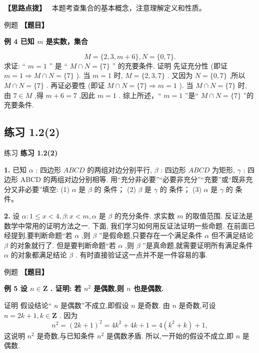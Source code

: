 \documentclass[a4paper,10pt,oneside,fontset=none]{ctexbook}
\renewcommand{\leq}{\leqslant}
\newcommand{\fillin}[1][2cm]{\,\underline{\hspace{#1}}\,}
\newcounter{example}[chapter]
\newenvironment{example}[1][]{\begin{exBox}{例题}{#1}}{\end{exBox}}
\newenvironment{exercise}[1][]{\begin{exBox}{练习}{#1}}{\end{exBox}}
\numberwithin{equation}{chapter}
\newenvironment{hint}{\begin{hintBox}\textbf{【思路点拨】}~}{\end{hintBox}}
\begin{document}
\begin{hint}
本题考查集合的基本概念，注意理解定义和性质。
\end{hint}

\begin{example}
\textbf{【题目】}\par\vspace{0.3em}
\textbf{例 4 已知 $m$ 是实数，集合}\par\vspace{0.3em}
$$
M = \{ 2,3, m + 6\} , N = \{ 0,7\} .
$$
求证: “ $m = 1$ ” 是 “ $M \cap  N = \{ 7\}$ ” 的充要条件.
证明 先证充分性 (即证 $m = 1 \Rightarrow  M \cap  N = \{ 7\}$ ). 当 $m = 1$ 时, $M = \{ 2,3,7\}$ . 又因为 $N = \{ 0,7\}$ ,所以 $M \cap  N = \{ 7\}$ .
再证必要性 (即证 $M \cap  N = \{ 7\}  \Rightarrow  m = 1$ ). 当 $M \cap  N = \{ 7\}$ 时, 由 $7 \in  M$ ,得 $m + 6 = 7$ ,因此 $m = 1$ .
综上所述，“ $m = 1$ ”是“ $M \cap  N = \{ 7\}$ ”的充要条件.
\end{example}

\subsection*{练习 1.2(2)}

\begin{exercise}
\textbf{练习 1.2(2)}\par\vspace{0.5em}
\textbf{1.} 已知 $\alpha$ : 四边形 ${ABCD}$ 的两组对边分别平行, $\beta$ : 四边形 ${ABCD}$ 为矩形, $\gamma$ : 四边形 ABCD 的两组对边分别相等. 用“充分非必要”“必要非充分”“充要”或“既非充分又非必要”填空: (1) $\alpha$ 是 $\beta$ 的\fillin[2cm]条件； (2) $\beta$ 是 $\gamma$ 的\fillin[2cm]条件； (3) $\alpha$ 是 $\gamma$ 的\fillin[2cm]条件。
\par\vspace{0.8em}
\textbf{2.} 设 $\alpha  : 1 \leq  x < 4,\beta  : x < m,\alpha$ 是 $\beta$ 的充分条件. 求实数 $m$ 的取值范围. 反证法是数学中常用的证明方法之一. 下面, 我们学习如何用反证法证明一些命题. 在前面已经提到,要判断命题“若 $\alpha$ ,则 $\beta$ ”是假命题,只要存在一个满足条件 $\alpha$ 但不满足结论 $\beta$ 的对象就行了. 但是要判断命题“若 $\alpha$ ,则 $\beta$ ”是真命题,就需要证明所有满足条件 $\alpha$ 的对象都满足结论 $\beta$ . 有时直接验证这一点并不是一件容易的事.
\end{exercise}

\begin{example}
\textbf{【题目】}\par\vspace{0.3em}
\textbf{例 5 设 $n \in  \mathbf{Z}$ . 证明: 若 ${n}^{2}$ 是偶数,则 $n$ 也是偶数.}\par\vspace{0.3em}
证明 假设结论“ $n$ 是偶数”不成立,即假设 $n$ 是奇数. 由 $n$ 是奇数,可设 $n = {2k} + 1, k \in  \mathbf{Z}$ .
因为
$$
{n}^{2} = {\left( 2k + 1\right) }^{2} = 4{k}^{2} + {4k} + 1 = 4\left( {{k}^{2} + k}\right)  + 1,
$$
这说明 ${n}^{2}$ 是奇数,与已知条件 ${n}^{2}$ 是偶数矛盾.
所以,一开始的假设不成立,即 $n$ 是偶数.
\end{example}
\end{document}
